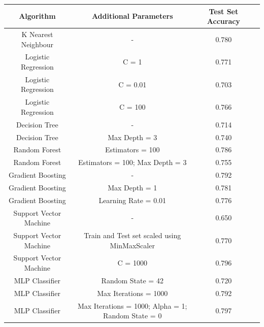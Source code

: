 \documentclass[12pt]{article}
\begin{document}
{
\clearpage
\begin{landscape}
\centering
\begin{table}[]
\centering
\begin{tabular}{|c|c|c|c|}
\hline
Algorithm              & Additional Parameters                               & Test Set Accuracy \\ \hline
K Nearest Neighbour    & -                                                   & 0.780             \\ \hline
Logistic Regression    & C = 1                                               & 0.771             \\ \hline
Logistic Regression    & C = 0.01                                            & 0.703             \\ \hline
Logistic Regression    & C = 100                                             & 0.766             \\ \hline
Decision Tree          & -                                                   & 0.714             \\ \hline
Decision Tree          & Max Depth = 3                                       & 0.740             \\ \hline
Random Forest          & Estimators = 100                                    & 0.786             \\ \hline
Random Forest          & Estimators = 100; Max Depth = 3                     & 0.755             \\ \hline
Gradient Boosting      & -                                                   & 0.792             \\ \hline
Gradient Boosting      & Max Depth = 1                                       & 0.781             \\ \hline
Gradient Boosting      & Learning Rate = 0.01                                & 0.776             \\ \hline
Support Vector Machine & -                                                   & 0.650             \\ \hline
Support Vector Machine & Train and Test set scaled using MinMaxScaler        & 0.770             \\ \hline
Support Vector Machine & C = 1000                                            & 0.796             \\ \hline
MLP Classifier         & Random State = 42                                   & 0.720             \\ \hline
MLP Classifier         & Max Iterations = 1000                               & 0.792             \\ \hline
MLP Classifier         & Max Iterations = 1000; Alpha = 1; Random State = 0  & 0.797             \\ \hline
\end{tabular}
\end{table}
\label{table:3}
\end{landscape}
\clearpage
}
\end{document}
